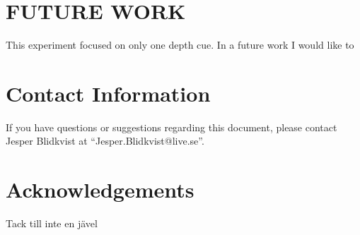 \documentclass[tog]{acmsiggraph}
\begin{document}
\section{FUTURE WORK}

This experiment focused on only one depth cue. In a future work I would like to 




\section{Contact Information}

If you have questions or suggestions regarding this document, please
contact Jesper Blidkvist at ``Jesper.Blidkvist@live.se''.

\section*{Acknowledgements}

Tack till inte en jävel


\nocite{*}

\end{document}
